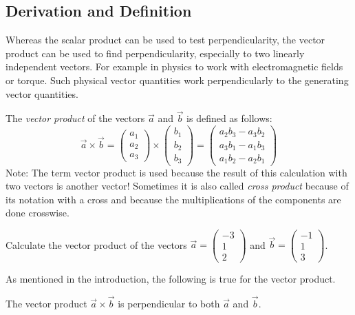 \documentclass[12pt,eng]{skript_ogg}
\begin{document}
\subsection{Derivation and Definition}
Whereas the scalar product can be used to test perpendicularity, the vector product can be used to find perpendicularity, especially to two linearly independent vectors. For example in physics to work with electromagnetic fields or torque. Such physical vector quantities work perpendicularly to the generating vector quantities.
\begin{defn}
The \emph{vector product} of the vectors $\vec{a}$ and $\vec{b}$ is defined as follows:
\[\vec{a}\times\vec{b}=\begin{pmatrix}
a_1\\a_2\\a_3
\end{pmatrix}\times\begin{pmatrix}
b_1\\b_2\\b_3
\end{pmatrix}=\begin{pmatrix}
a_2b_3-a_3b_2\\a_3b_1-a_1b_3\\a_1b_2-a_2b_1
\end{pmatrix}\]
Note: The term vector product is used because the result of this calculation with two vectors is another vector! Sometimes it is also called \emph{cross product} because of its notation with a cross and because the multiplications of the components are done crosswise.
\end{defn}
\begin{uebung}
Calculate the vector product of the vectors $\vec{a}=\begin{pmatrix} -3\\1\\2 \end{pmatrix}$ and $\vec{b}=\begin{pmatrix} -1\\1\\3 \end{pmatrix}$.

\vspace{3cm}
\end{uebung}

As mentioned in the introduction, the following is true for the vector product.

\begin{satz}
The vector product $\vec{a}\times\vec{b}$ is perpendicular to both $\vec{a}$ and $\vec{b}$.
\end{satz} 
\end{document}
